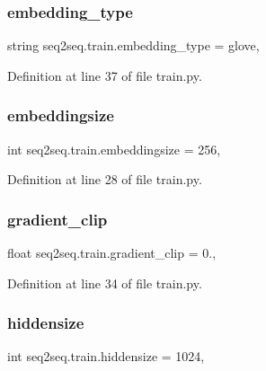 \subsubsection{\texorpdfstring{embedding\+\_\+type}{embedding\_type}}
{\footnotesize\ttfamily string seq2seq.\+train.\+embedding\+\_\+type = \textquotesingle{}glove\textquotesingle{},}



Definition at line 37 of file train.\+py.

\mbox{\label{namespaceseq2seq_1_1train_a99501e666322fecdd98478eaf160e75f}} 
\subsubsection{\texorpdfstring{embeddingsize}{embeddingsize}}
{\footnotesize\ttfamily int seq2seq.\+train.\+embeddingsize = 256,}



Definition at line 28 of file train.\+py.

\mbox{\label{namespaceseq2seq_1_1train_a83e48008fc512270e9925dd68e036f5f}} 
\subsubsection{\texorpdfstring{gradient\+\_\+clip}{gradient\_clip}}
{\footnotesize\ttfamily float seq2seq.\+train.\+gradient\+\_\+clip = 0.,}



Definition at line 34 of file train.\+py.

\mbox{\label{namespaceseq2seq_1_1train_aa53b5dc290c67994aab3ea0e0c45a916}} 
\subsubsection{\texorpdfstring{hiddensize}{hiddensize}}
{\footnotesize\ttfamily int seq2seq.\+train.\+hiddensize = 1024,}



